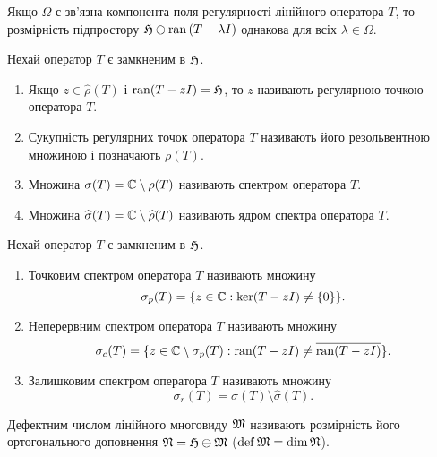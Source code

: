 \begin{theorem} \label{dim_for_all_lambda}
	Якщо $\Omega$ є зв'язна компонента поля регулярності лінійного оператора $T$, то розмірність підпростору $\mathfrak{H} \ominus \operatorname{ran}{(T - \lambda I)}$ однакова для всіх $\lambda \in \Omega$.
\end{theorem}

\begin{definition}
	Нехай оператор $T$ є замкненим в $\mathfrak{H}$.
	\begin{enumerate}
		\item Якщо $z\in\widehat\rho(T)$ і $\operatorname{ran}(T-zI)=\mathfrak{H}$, то $z$ називають регулярною точкою оператора $T$.
		\item Сукупність регулярних точок оператора $T$ називають його резольвентною множиною і позначають $\rho(T)$.
		\item Множина $\sigma(T)=\mathbb{C}\setminus\rho(T)$ називають спектром оператора $T$.
		\item Множина $\widehat\sigma(T)=\mathbb{C}\setminus\widehat\rho(T)$ називають ядром спектра оператора $T$.
	\end{enumerate}
\end{definition}

\begin{definition}
	Нехай оператор $T$ є замкненим в $\mathfrak{H}$.
	\begin{enumerate}
		\item Точковим спектром оператора $T$ називають множину
		\begin{equation}
		 	\sigma_p(T) = \{z\in\mathbb{C} : \ker(T-zI)\ne\{0\}\}.
		\end{equation}
		\item Неперервним спектром оператора $T$ називають множину
		\begin{equation}
			\sigma_c(T) = \{z\in\mathbb{C}\setminus\sigma_p(T) : \operatorname{ran}(T-zI)\ne\overline{\operatorname{ran}(T-zI)}\}.
		\end{equation}
		\item Залишковим спектром оператора $T$ називають множину
		\begin{equation}
			\sigma_r(T) = \sigma(T)\setminus\widehat\sigma(T).
		\end{equation}
	\end{enumerate}
\end{definition}

\begin{definition}
	Дефектним числом лінійного многовиду $\mathfrak{M}$ називають розмірність його ортогонального доповнення $\mathfrak{N} = \mathfrak{H} \ominus \mathfrak{M}$ ($\operatorname{def} \mathfrak{M} = \dim{\mathfrak{N}}$).
\end{definition}

